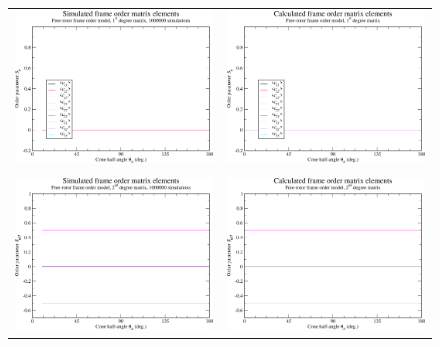 \begin{figure}
\centering
  \begin{tabular}{@{}cc@{}}
    \includegraphics[width=.5\textwidth]{images/frame_order_matrix/Sij_free_rotor_in_frame_theta_z_ens1000000.eps} &
    \includegraphics[width=.5\textwidth]{images/frame_order_matrix/Sij_free_rotor_in_frame_theta_z_calc.eps} \\
    \\[-5pt]
    \includegraphics[width=.5\textwidth]{images/frame_order_matrix/Sijkl_free_rotor_in_frame_theta_z_ens1000000.eps} &
    \includegraphics[width=.5\textwidth]{images/frame_order_matrix/Sijkl_free_rotor_in_frame_theta_z_calc.eps} \\

\end{tabular}
\end{figure}
